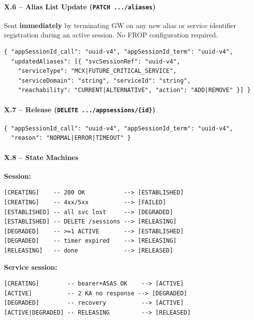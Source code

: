 \documentclass[11pt,a4paper]{article}
\begin{document}
\paragraph{X.6 -- Alias List Update (\texttt{PATCH .../aliases})}
\label{x6}
Sent \textbf{immediately} by terminating GW on any new alias or service identifier
registration during an active session. No FROP configuration required.

\begin{lstlisting}[language={}]
{ "appSessionId_call": "uuid-v4", "appSessionId_term": "uuid-v4",
  "updatedAliases": [{ "svcSessionRef": "uuid-v4",
    "serviceType": "MCX|FUTURE_CRITICAL_SERVICE",
    "serviceDomain": "string", "serviceId": "string",
    "reachability": "CURRENT|ALTERNATIVE", "action": "ADD|REMOVE" }] }
\end{lstlisting}

\paragraph{X.7 -- Release (\texttt{DELETE .../appsessions/\{id\}})}
\label{x7}
\begin{lstlisting}[language={}]
{ "appSessionId_call": "uuid-v4", "appSessionId_term": "uuid-v4",
  "reason": "NORMAL|ERROR|TIMEOUT" }
\end{lstlisting}

\paragraph{X.8 -- State Machines}
\label{x8}
\textbf{Session:}
\begin{lstlisting}[language={}]
[CREATING]    -- 200 OK           --> [ESTABLISHED]
[CREATING]    -- 4xx/5xx          --> [FAILED]
[ESTABLISHED] -- all svc lost     --> [DEGRADED]
[ESTABLISHED] -- DELETE /sessions --> [RELEASING]
[DEGRADED]    -- >=1 ACTIVE       --> [ESTABLISHED]
[DEGRADED]    -- timer expired    --> [RELEASING]
[RELEASING]   -- done             --> [RELEASED]
\end{lstlisting}

\textbf{Service session:}
\begin{lstlisting}[language={}]
[CREATING]        -- bearer+ASAS OK    --> [ACTIVE]
[ACTIVE]          -- 2 KA no response --> [DEGRADED]
[DEGRADED]        -- recovery          --> [ACTIVE]
[ACTIVE|DEGRADED] -- RELEASING         --> [RELEASED]
\end{lstlisting}
\end{document}
